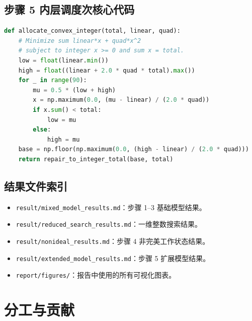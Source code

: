\documentclass[12pt,a4paper,UTF8]{article}
\begin{document}
\subsection{步骤 5 内层调度次核心代码}
\label{app:code-step5}

\begin{lstlisting}[language=Python]
def allocate_convex_integer(total, linear, quad):
    # Minimize sum linear*x + quad*x^2
    # subject to integer x >= 0 and sum x = total.
    low = float(linear.min())
    high = float((linear + 2.0 * quad * total).max())
    for _ in range(90):
        mu = 0.5 * (low + high)
        x = np.maximum(0.0, (mu - linear) / (2.0 * quad))
        if x.sum() < total:
            low = mu
        else:
            high = mu
    base = np.floor(np.maximum(0.0, (high - linear) / (2.0 * quad)))
    return repair_to_integer_total(base, total)
\end{lstlisting}

\subsection{结果文件索引}

\begin{itemize}
    \item \texttt{result/mixed\_model\_results.md}：步骤 1--3 基础模型结果。
    \item \texttt{result/reduced\_search\_results.md}：一维整数搜索结果。
    \item \texttt{result/nonideal\_results.md}：步骤 4 非完美工作状态结果。
    \item \texttt{result/extended\_model\_results.md}：步骤 5 扩展模型结果。
    \item \texttt{report/figures/}：报告中使用的所有可视化图表。
\end{itemize}

\section{分工与贡献}
\end{document}
